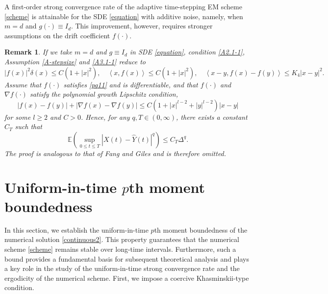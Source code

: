 \documentclass[preprint,12pt,compress]{elsarticle}
\newtheorem{remark}[theorem]{Remark}
\begin{document}
A first-order strong convergence rate of the adaptive time-stepping EM scheme \eqref{scheme} is attainable for the SDE \eqref{equation} with additive noise, namely, when $m=d$ and $g(\cdot)\equiv I_d$. This improvement, however, requires stronger assumptions on the drift coefficient $f(\cdot)$. 

\begin{remark}  \label{remark-3}
		If we take $m = d$ and $g  \equiv  I_d$ in SDE \eqref{equation},  condition \eqref{A2.1-1}, Assumption \ref{A-stepsize} and \eqref{A3.1-1} reduce to
		\begin{equation}  \label{pq11}
			{\left| {f(x)} \right|^2}\delta (x) \le C(1 + {\left| x \right|^2}), \quad  \left\langle {x,f(x)} \right\rangle  \le C(1 + {\left| x \right|^2}), \quad \left\langle {x - y,f(x) - f(y)} \right\rangle  \le {K_4}{\left| {x - y} \right|^2}.
		\end{equation}
		Assume that $f(\cdot)$ satisfies \eqref{pq11} and is differentiable, and that $f(\cdot)$ and $\nabla f (\cdot)$ satisfy the polynomial growth Lipschitz condition,
		\begin{equation}  \label{pq12}
			\left| {f(x) - f(y)} \right| + \left| {\nabla f(x) - \nabla f(y)} \right| \le C\left( {1 + {{\left| x \right|}^{l - 2}} + {{\left| y \right|}^{l - 2}}} \right)\left| {x - y} \right|
		\end{equation}
		for some $l \ge 2$ and $C > 0$. Hence, for any $q, T \in (0, \infty)$, there exists a constant $C_{ T}$ such that
		\begin{equation*}
			\mathbb{E}\left( {\mathop {\sup }\limits_{0 \le t \le T} {{\left| {X(t) - \hat Y(t)} \right|}^q}} \right) \le {C_{T}}{\Delta ^q}.
		\end{equation*}
		The proof is analogous to that of Fang and Giles \cite[Theorem 3]{fang2016adaptive} and is therefore omitted.
	\end{remark}



\section{Uniform-in-time $p$th moment boundedness}  \label{sec5}
In this section, we establish the uniform-in-time $p$th moment boundedness of the numerical solution \eqref{continuous2}. This property guarantees that the numerical scheme \eqref{scheme} remains stable over long-time intervals. Furthermore, such a bound provides a fundamental basis for subsequent theoretical analysis and plays a key role in the study of the uniform-in-time strong convergence rate and the ergodicity of the numerical scheme. First, we impose a coercive Khasminskii-type condition.
\end{document}
